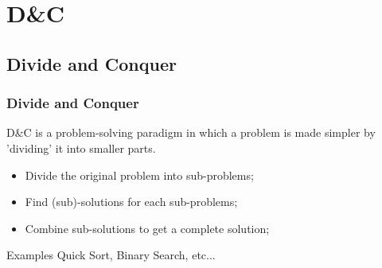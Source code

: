 \documentclass{beamer}
\begin{document}

\section{D\&C}
\subsection{Divide and Conquer}
\begin{frame}
  \frametitle{Divide and Conquer}

  D\&C is a problem-solving paradigm in which a problem is made
  simpler by 'dividing' it into smaller parts.

  \begin{itemize}
  \item Divide the original problem into sub-problems;
  \item Find (sub)-solutions for each sub-problems;
  \item Combine sub-solutions to get a complete solution;
  \end{itemize}

  \begin{block}{Examples}
    Quick Sort, Binary Search, etc...
  \end{block}
\end{frame}





\end{document}
